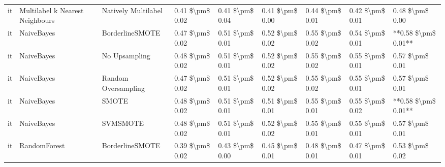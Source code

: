 \begin{tabular}{lllllllll}
      it & Multilabel k Nearest Neighbours &           Natively Multilabel & 0.41 \$\textbackslash pm\$ 0.02 &           0.41 \$\textbackslash pm\$ 0.04 &       0.41 \$\textbackslash pm\$ 0.00 &        0.44 \$\textbackslash pm\$ 0.01 &                         0.42 \$\textbackslash pm\$ 0.01 &     0.48 \$\textbackslash pm\$ 0.00 \\
      it &                      NaiveBayes &               BorderlineSMOTE & 0.47 \$\textbackslash pm\$ 0.02 &           0.51 \$\textbackslash pm\$ 0.01 &       0.52 \$\textbackslash pm\$ 0.02 &        0.55 \$\textbackslash pm\$ 0.02 &                         0.54 \$\textbackslash pm\$ 0.01 & **0.58 \$\textbackslash pm\$ 0.01** \\
      it &                      NaiveBayes &                 No Upsampling & 0.48 \$\textbackslash pm\$ 0.02 &           0.51 \$\textbackslash pm\$ 0.01 &       0.52 \$\textbackslash pm\$ 0.02 &        0.55 \$\textbackslash pm\$ 0.02 &                         0.55 \$\textbackslash pm\$ 0.01 &     0.57 \$\textbackslash pm\$ 0.01 \\
      it &                      NaiveBayes &           Random Oversampling & 0.47 \$\textbackslash pm\$ 0.02 &           0.51 \$\textbackslash pm\$ 0.01 &       0.52 \$\textbackslash pm\$ 0.02 &        0.55 \$\textbackslash pm\$ 0.02 &                         0.55 \$\textbackslash pm\$ 0.01 &     0.57 \$\textbackslash pm\$ 0.01 \\
      it &                      NaiveBayes &                         SMOTE & 0.48 \$\textbackslash pm\$ 0.02 &           0.51 \$\textbackslash pm\$ 0.01 &       0.51 \$\textbackslash pm\$ 0.01 &        0.55 \$\textbackslash pm\$ 0.01 &                         0.55 \$\textbackslash pm\$ 0.02 & **0.58 \$\textbackslash pm\$ 0.01** \\
      it &                      NaiveBayes &                      SVMSMOTE & 0.48 \$\textbackslash pm\$ 0.02 &           0.51 \$\textbackslash pm\$ 0.01 &       0.52 \$\textbackslash pm\$ 0.02 &        0.55 \$\textbackslash pm\$ 0.01 &                         0.55 \$\textbackslash pm\$ 0.01 &     0.57 \$\textbackslash pm\$ 0.01 \\
      it &                    RandomForest &               BorderlineSMOTE & 0.39 \$\textbackslash pm\$ 0.02 &           0.43 \$\textbackslash pm\$ 0.00 &       0.45 \$\textbackslash pm\$ 0.01 &        0.48 \$\textbackslash pm\$ 0.01 &                         0.47 \$\textbackslash pm\$ 0.01 &     0.53 \$\textbackslash pm\$ 0.02 \\

\end{tabular}
